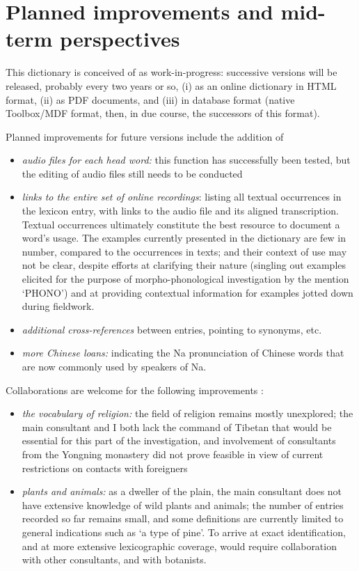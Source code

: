 	\section{Planned improvements and mid-term perspectives} \label{sec:improv}
	
This dictionary is conceived of as work-in-progress: successive versions will be released, probably every two years or so, (i) as an online dictionary in HTML format, (ii) as PDF documents, and (iii) in database format (native Toolbox/MDF format, then, in due course, the successors of this format). 

Planned improvements for future versions include the addition of
\begin{itemize}
	\item \textit{audio files for each head word:} this function has successfully been tested, but the editing of audio files still needs to be conducted
	\item \textit{links to the entire set of online recordings}: listing all textual occurrences in the lexicon entry, with links to the audio file and its aligned transcription. Textual occurrences ultimately constitute the best resource to document a word's usage. The examples currently presented in the dictionary are few in number, compared to the occurrences in texts; and their context of use may not be clear, despite efforts at clarifying their nature (singling out examples elicited for the purpose of morpho-phonological investigation by the mention ‘PHONO') and at providing contextual information for examples jotted down during fieldwork.
	\item \textit{additional cross-references} between entries, pointing to synonyms, etc.
	\item \textit{more Chinese loans:} indicating the Na pronunciation of Chinese words that are now commonly used by speakers of Na.
\end{itemize}

Collaborations are welcome for the following improvements :
\begin{itemize}
	\item \textit{the vocabulary of religion:} the field of religion remains mostly unexplored; the main consultant and I both lack the command of Tibetan that would be essential for this part of the investigation, and involvement of consultants from the Yongning monastery did not prove feasible in view of current restrictions on contacts with foreigners
	\item \textit{plants and animals:} as a dweller of the plain, the main consultant does not have extensive knowledge of wild plants and animals; the number of entries recorded so far remains small, and some definitions are currently limited to general indications such as ‘a type of pine'. To arrive at exact identification, and at more extensive lexicographic coverage, would require collaboration with other consultants, and with botanists.
\end{itemize}

